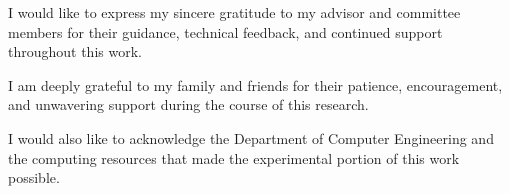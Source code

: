 I would like to express my sincere gratitude to my advisor and committee members for their guidance, technical feedback, and continued support throughout this work.

I am deeply grateful to my family and friends for their patience, encouragement, and unwavering support during the course of this research.

I would also like to acknowledge the Department of Computer Engineering and the computing resources that made the experimental portion of this work possible.
